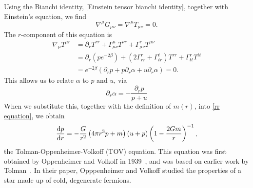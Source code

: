 Using the Bianchi identity, \autoref{Einstein tensor bianchi identity}, together with Einstein's equation, we find
%
\begin{equation}
    \nabla^\mu G_{\mu \nu} = \nabla^\mu T_{\mu \nu} = 0.
\end{equation}
%
The $r$-component of this equation is
%
\begin{align*}
    \nabla_\mu T^{\mu r} 
    & =
    \partial_r T^{rr} 
    + \Gamma^\mu_{\mu \nu} T^{\nu r} 
    + \Gamma^r_{\mu \nu} T^{\mu \nu}\\
    & = 
    \partial_r \left(p e^{-2\beta}\right)
    + (2 \Gamma^r_{rr} + \Gamma^t_{tr}) T^{rr} 
    + \Gamma^r_{tt}T^{tt} \\ 
    &=   e^{-2\beta} \left( \partial_r p + p \partial_r \alpha + u \partial_r \alpha \right) = 0.
\end{align*} 
%
This allows us to relate $\alpha$ to $p$ and $u$, via
\begin{equation}
    \partial_r \alpha = - \frac{\partial_r p}{p + u}
\end{equation}
%
When we substitute this, together with the definition of $m(r)$, into \autoref{rr equation}, we obtain
%
\begin{equation}
    \label{TOV}
    \diff{p}{r}
    =
    -
    \frac{G}{r^2} 
    \left(4 \pi r^{3} p + m \right) 
    \left(u + p \right)
    \left(1 - \frac{2 G m}{r}\right)^{-1},
\end{equation}
%
the Tolman-Oppenheimer-Volkoff (TOV) equation.
This equation was first obtained by Oppenheimer and Volkoff in 1939~\autocite{oppenheimerMassiveNeutronCores1939}, and was based on earlier work by Tolman~\autocite{tolmanRelativityThermodynamicsCosmology1934}.
In their paper, Opppenheimer and Volkoff studied the properties of a star made up of cold, degenerate fermions.

